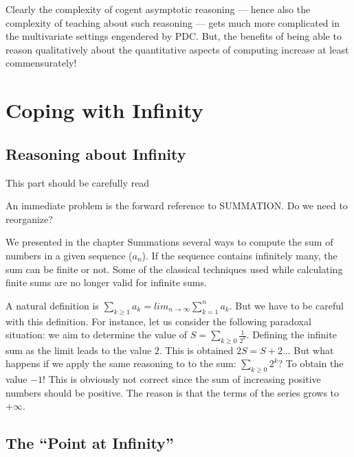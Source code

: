 Clearly the complexity of cogent asymptotic reasoning --- hence also
the complexity of teaching about such reasoning --- gets much more
complicated in the multivariate settings engendered by PDC.  But, the
benefits of being able to reason qualitatively about the quantitative
aspects of computing increase at least commensurately!



\section{Coping with Infinity}
\label{sec:reasoning-infinity}

\subsection{Reasoning about Infinity}
\label{sec:reasoning-infinity}

{\Denis This part should be carefully read}

{\Arny An immediate problem is the forward reference to SUMMATION.  Do
  we need to reorganize?}


We presented in the chapter Summations several ways to compute the sum
of numbers in a given sequence ($a_n$).  If the sequence contains
infinitely many, the sum can be finite or not.  Some of the classical
techniques used while calculating finite sums are no longer valid for
infinite sums.


A natural definition is $\sum_{k \geq 1} a_k = lim_{n \rightarrow \infty} \sum_{k=1}^{n} a_k$.
But we have to be careful with this definition. 
For instance, let us consider the following paradoxal situation:
we aim to determine the value of $S = \sum_{k \geq 0} \frac{1}{2^k}$.
Defining the infinite sum as the limit leads to the value $2$. 
This is obtained $2S = S+2$...
But what happens if we apply the same reasoning to to the sum: $\sum _{k \geq 0} 2^k$?
To obtain the value $-1$!
This is obviously not correct since the sum of increasing positive numbers should be positive.
The reason is that the terms of the series grows to $+\infty$.


\subsection{The ``Point at Infinity''}
\label{sec:point-at-infinity}

